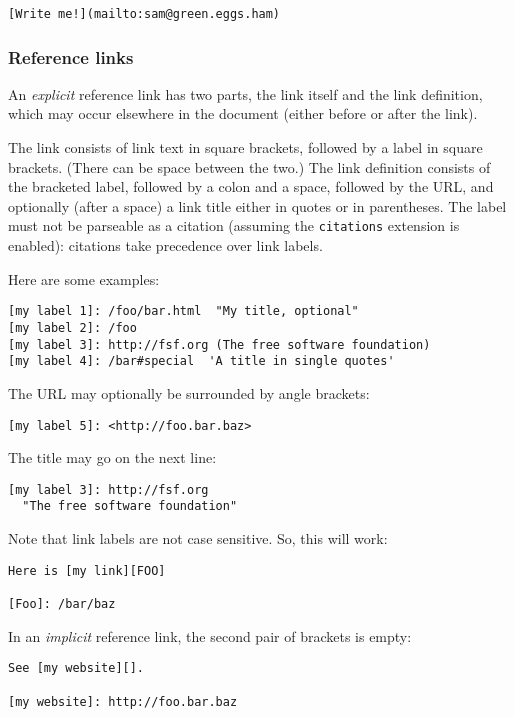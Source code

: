 \documentclass[]{article}
\begin{document}
\begin{verbatim}
[Write me!](mailto:sam@green.eggs.ham)
\end{verbatim}

\subsubsection{Reference links}\label{reference-links}

An \emph{explicit} reference link has two parts, the link itself and the
link definition, which may occur elsewhere in the document (either
before or after the link).

The link consists of link text in square brackets, followed by a label
in square brackets. (There can be space between the two.) The link
definition consists of the bracketed label, followed by a colon and a
space, followed by the URL, and optionally (after a space) a link title
either in quotes or in parentheses. The label must not be parseable as a
citation (assuming the \texttt{citations} extension is enabled):
citations take precedence over link labels.

Here are some examples:

\begin{verbatim}
[my label 1]: /foo/bar.html  "My title, optional"
[my label 2]: /foo
[my label 3]: http://fsf.org (The free software foundation)
[my label 4]: /bar#special  'A title in single quotes'
\end{verbatim}

The URL may optionally be surrounded by angle brackets:

\begin{verbatim}
[my label 5]: <http://foo.bar.baz>
\end{verbatim}

The title may go on the next line:

\begin{verbatim}
[my label 3]: http://fsf.org
  "The free software foundation"
\end{verbatim}

Note that link labels are not case sensitive. So, this will work:

\begin{verbatim}
Here is [my link][FOO]

[Foo]: /bar/baz
\end{verbatim}

In an \emph{implicit} reference link, the second pair of brackets is
empty:

\begin{verbatim}
See [my website][].

[my website]: http://foo.bar.baz
\end{verbatim}
\end{document}
